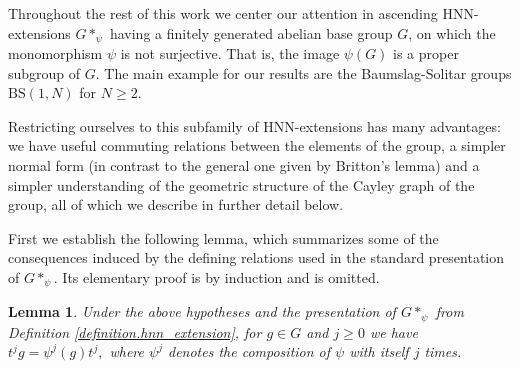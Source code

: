 \documentclass[letterpaper,11pt,reqno]{amsart}
\theoremstyle{plain}
\newtheorem{lemma}[theorem]{Lemma}
\theoremstyle{definition}
\begin{document}
Throughout the rest of this work we center our attention in ascending HNN-extensions $G*_{\psi}$ having a finitely generated abelian base group $G$, on which the monomorphism $\psi$ is not surjective. That is, the image $\psi(G)$ is a proper subgroup of $G$. The main example for our results are the Baumslag-Solitar groups $\mathrm{BS}(1,N)$ for $N\ge 2$.

Restricting ourselves to this subfamily of HNN-extensions has many advantages: we have useful commuting relations between the elements of the group, a simpler normal form (in contrast to the general one given by Britton's lemma) and a simpler understanding of the geometric structure of the Cayley graph of the group, all of which we describe in further detail below.

First we establish the following lemma, which summarizes some of the consequences induced by the defining relations used in the standard presentation of $G*_{\psi}$. Its elementary proof is by induction and is omitted.

\begin{lemma}\label{lemma:ascending_hnn_further_identifications}
	Under the above hypotheses and the presentation of $G*_{\psi}$ from Definition \ref{definition.hnn_extension}, for $g\in G$ and $j\ge 0$ we have $	t^jg=\psi^j(g)t^j,$ where $\psi^j$ denotes the composition of $\psi$ with itself $j$ times.
\end{lemma}
\end{document}

